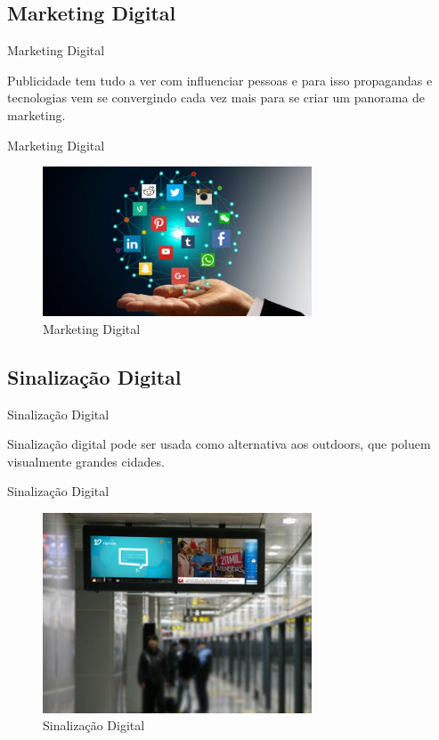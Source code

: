 \documentclass{aula-ifb}
\begin{document}
\subsection{Marketing Digital}
\begin{frame}{Marketing Digital}
\begin{center}
Publicidade tem tudo a ver com influenciar pessoas e para isso propagandas e tecnologias vem se convergindo cada vez mais para se criar um panorama de marketing.
\end{center}
\end{frame}

\begin{frame}{Marketing Digital}
\begin{figure}[h]
\includegraphics[width=8cm]{figuras/marketingdigital.png}
\caption{Marketing Digital}
\label{fig:siteifb}
\end{figure}
\end{frame}

\subsection{Sinalização Digital}
\begin{frame}{Sinalização Digital}
\begin{center}
Sinalização digital pode ser usada como alternativa aos outdoors, que poluem visualmente grandes cidades.
\end{center}
\end{frame}

\begin{frame}{Sinalização Digital}
\begin{figure}[h]
\includegraphics[width=8cm]{figuras/sinalizacaodigital.png}
\caption{Sinalização Digital}
\label{fig:siteifb}
\end{figure}
\end{frame}
\end{document}
